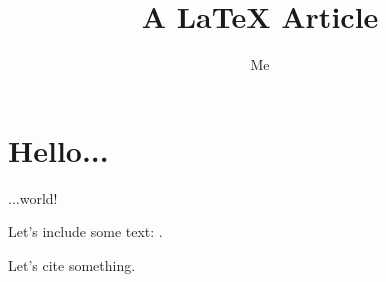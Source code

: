 \documentclass[a4paper,12pt]{article}
\title{A LaTeX Article}
\author{Me}
\begin{document}
\maketitle

\section{Hello...}

...world!

Let's include some text: .

Let's cite something\cite{FRENOT:2010:INRIA-00436041:1}.



\end{document}
